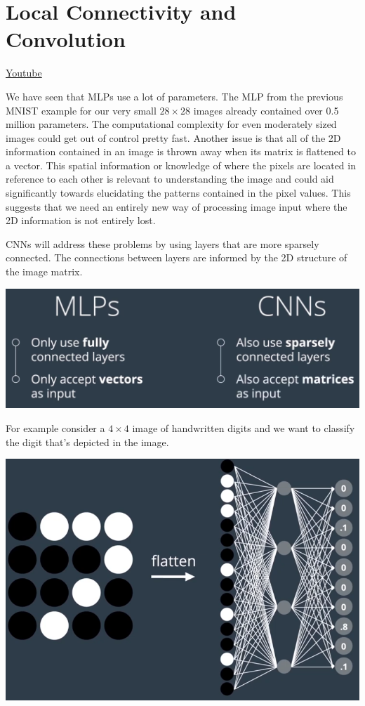 \section{Local Connectivity and Convolution}
\href{https://www.youtube.com/watch?v=45614Pk3JM4&ab_channel=Udacity}{Youtube} \newline

We have seen that MLPs use a lot of parameters. The MLP from the previous MNIST example for our very small \(28 \times 28\) images already contained over 0.5 million parameters. The computational complexity for even moderately sized images could get out of control pretty fast.
Another issue is that all of the 2D information contained in an image is thrown away when its matrix is flattened to a vector.
This spatial information or knowledge of where the pixels are located in reference to each other is relevant to understanding the image and could aid significantly towards elucidating the patterns contained in the pixel values. This suggests that we need an entirely new way of processing image input where the 2D information is not entirely lost. \newline

CNNs will address these problems by using layers that are more sparsely connected. The connections between layers are informed by the 2D structure of the image matrix.

\includegraphics[width=1\linewidth]{img//cnn//concepts/image.png}

For example consider a \(4 \times 4\) image of handwritten digits and we want to classify the digit that's depicted in the image.

\includegraphics[width=1\linewidth]{img//cnn//concepts/image2.png}
\label{figure:concepts/image2}

